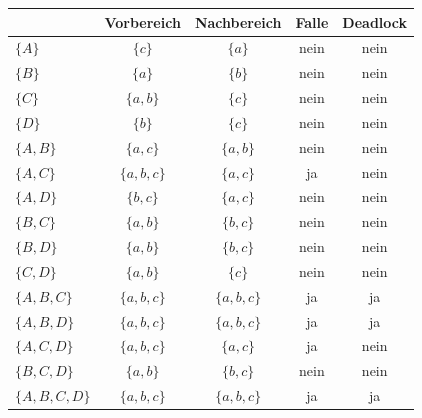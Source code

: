 \documentclass[12pt]{scrartcl}
\begin{document}
    \renewcommand{\arraystretch}{1.3}
    \begin{center}
        \begin{tabular}{l|c|c|c|c}
            & Vorbereich & Nachbereich & Falle & Deadlock \\
            \hline
            $\{A\}$           & $\{c\}$       & $\{a\}$       & nein & nein \\
            \hline
            $\{B\}$           & $\{a\}$       & $\{b\}$       & nein & nein \\
            \hline
            $\{C\}$           & $\{a, b\}$    & $\{c\}$       & nein & nein \\
            \hline
            $\{D\}$           & $\{b\}$       & $\{c\}$       & nein & nein \\
            \hline
            $\{A, B\}$        & $\{a, c\}$    & $\{a, b\}$    & nein & nein \\
            \hline
            $\{A, C\}$        & $\{a, b, c\}$ & $\{a, c\}$    & ja   & nein \\
            \hline
            $\{A, D\}$        & $\{b, c\}$    & $\{a, c\}$    & nein & nein \\
            \hline
            $\{B, C\}$        & $\{a, b\}$    & $\{b, c\}$    & nein & nein \\
            \hline
            $\{B, D\}$        & $\{a, b\}$    & $\{b, c\}$    & nein & nein \\
            \hline
            $\{C, D\}$        & $\{a, b\}$    & $\{c\}$       & nein & nein \\
            \hline
            $\{A, B, C\}$     & $\{a, b, c\}$ & $\{a, b, c\}$ & ja   & ja   \\
            \hline
            $\{A, B, D\}$     & $\{a, b, c\}$ & $\{a, b, c\}$ & ja   & ja   \\
            \hline
            $\{A, C, D\}$     & $\{a, b, c\}$ & $\{a, c\}$    & ja   & nein \\
            \hline
            $\{B, C, D\}$     & $\{a, b\}$    & $\{b, c\}$    & nein & nein \\
            \hline
            $\{A, B, C, D\}$  & $\{a, b, c\}$ & $\{a, b, c\}$ & ja   & ja   \\
        \end{tabular}
    \end{center}
\end{document}
